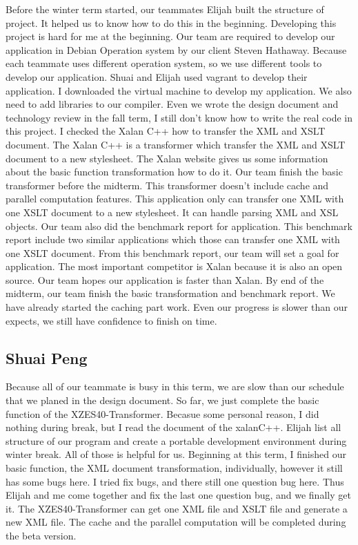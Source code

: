 Before the winter term started, our teammates Elijah built the structure of project. 
It helped us to know how to do this in the beginning. 
Developing this project is hard for me at the beginning.
Our team are required to develop our application in Debian Operation system by our client Steven Hathaway.
Because each teammate uses different operation system, so we use different tools to develop our application.
Shuai and Elijah used vagrant to develop their application.
I downloaded the virtual machine to develop my application.
We also need to add libraries to our compiler.  
Even we wrote the design document and technology review in the fall term, I still don't know how to write the real code in this project. 
I checked the Xalan C++ how to transfer the XML and XSLT document.
The Xalan C++ is a transformer which transfer the XML and XSLT document to a new stylesheet.
The Xalan website gives us some information about the basic function transformation how to do it. 
Our team finish the basic transformer before the midterm.
This transformer doesn’t include cache and parallel computation features. 
This application only can transfer one XML with one XSLT document to a new stylesheet.
It can handle parsing XML and XSL objects. Our team also did the benchmark report for application. 
This benchmark report include two similar applications which those can transfer one XML with one XSLT document.
From this benchmark report, our team will set a goal for application.
The most important competitor is Xalan because it is also an open source. Our team hopes our application is faster than Xalan.
By end of the midterm, our team finish the basic transformation and benchmark report.
We have already started the caching part work. 
Even our progress is slower than our expects, we still have confidence to finish on time. 

\subsection{Shuai Peng}

Because all of our teammate is busy in this term, we are slow than our schedule that we planed in the design document. 
So far, we just complete the basic function of the XZES40-Transformer.
Becasue some personal reason, I did nothing during break, but I read the document of the xalanC++.
Elijah list all structure of our program and create a portable development environment during winter break. 
All of those is helpful for us.
Beginning at this term, I finished our basic function, the XML document transformation, individually, however it still has some bugs here.
I tried fix bugs, and there still one question bug here.
Thus Elijah and me come together and fix the last one question bug, and we finally get it.
The XZES40-Transformer can get one XML file and XSLT file and generate a new XML file.
The cache and the parallel computation will be completed during the beta version.

